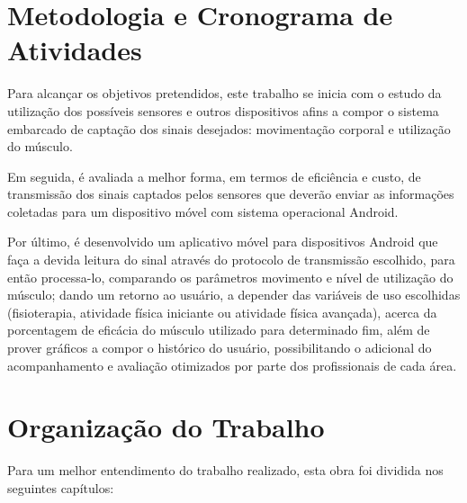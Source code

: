 
\section{Metodologia e Cronograma de Atividades}

    Para alcançar os objetivos pretendidos, este trabalho se inicia com o estudo da utilização dos possíveis sensores e outros dispositivos afins a compor o sistema embarcado de captação dos sinais desejados: movimentação corporal e utilização do músculo.
    
    Em seguida, é avaliada a melhor forma, em termos de eficiência e custo, de transmissão dos sinais captados pelos sensores que deverão enviar as informações coletadas para um dispositivo móvel com sistema operacional Android. 
    
    Por último, é desenvolvido um aplicativo móvel para dispositivos Android que faça a devida leitura do sinal através do protocolo de transmissão escolhido, para então processa-lo, comparando os parâmetros movimento e nível de utilização do músculo; dando um retorno ao usuário, a depender das variáveis de uso escolhidas (fisioterapia, atividade física iniciante ou atividade física avançada), acerca da porcentagem de eficácia do músculo utilizado para determinado fim, além de prover gráficos a compor o histórico do usuário, possibilitando o adicional do acompanhamento e avaliação otimizados por parte dos profissionais de cada área. 




\section{Organização do Trabalho}

    Para um melhor entendimento do trabalho realizado, esta obra foi dividida nos seguintes capítulos:
    
